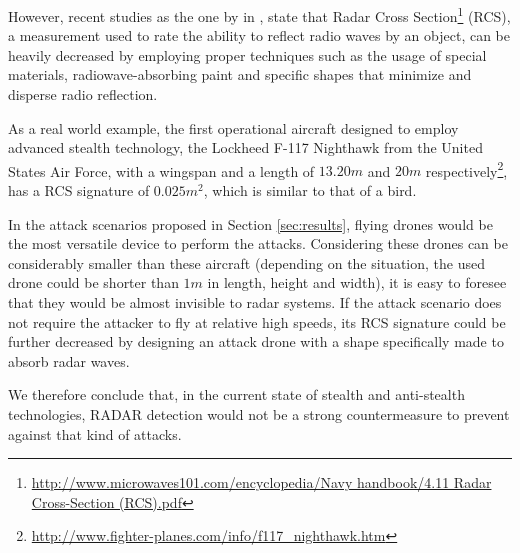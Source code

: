 \documentclass{article}
\begin{document}
However, recent studies as the one by \citeauthor{cadirci2009rf} in \cite{cadirci2009rf}, state that Radar Cross Section\footnote{\url{http://www.microwaves101.com/encyclopedia/Navy handbook/4.11 Radar Cross-Section (RCS).pdf}} (RCS), a measurement used to rate the ability to reflect radio waves by an object, can be heavily decreased by employing proper techniques such as the usage of special materials, radiowave-absorbing paint and specific shapes that minimize and disperse radio reflection.

As a real world example, the first operational aircraft designed to employ advanced stealth technology, the Lockheed F-117 Nighthawk from the United States Air Force, with a wingspan and a length of $13.20m$ and $20m$ respectively\footnote{\url{http://www.fighter-planes.com/info/f117_nighthawk.htm}}, has a RCS signature of $0.025m^2$, which is similar to that of a bird\cite{cadirci2009rf}.

In the attack scenarios proposed in Section \ref{sec:results}, flying drones would be the most versatile device to perform the attacks. Considering these drones can be considerably smaller than these aircraft (depending on the situation, the used drone could be shorter than $1m$ in length, height and width), it is easy to foresee that they would be almost invisible to radar systems. If the attack scenario does not require the attacker to fly at relative high speeds, its RCS signature could be further decreased by designing an attack drone with a shape specifically made to absorb radar waves.

We therefore conclude that, in the current state of stealth and anti-stealth technologies, RADAR detection would not be a strong countermeasure to prevent against that kind of attacks.
\end{document}
